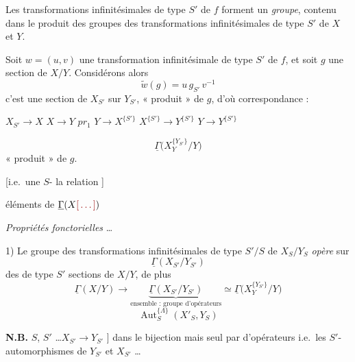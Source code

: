 \documentclass[11pt,a4paper]{article}
\begin{document}

Les transformations infinitésimales de type $S'$ de $f$ forment un
\emph{groupe}, contenu dans le produit des groupes des transformations
infinitésimales de type $S'$ de $X$ et $Y$.

Soit $w = (u, v)$ une transformation infinitésimale de type $S'$ de $f$, et
soit $g$ une section de $X/Y$. Considérons alors
\[
  \widetilde{w}(g) = u\, g_{S'}\, v^{-1}
\]
c'est une section de $X_{S'}$ sur $Y_{S'}$, « produit » de $g$, d'où
correspondance : \ill{}

\struck{\ill{}} $X_{S'} \to X$ \ill{} $X \to Y$  $pr_{1}$
\ill{} $Y \to X^{\{S'\}}$ \ill{} $X^{\{S'\}} \to Y^{\{S'\}}$ \ill{}
$Y \to Y^{\{S'\}}$ \ill{}

\[
  \underline{\Gamma}\bigl(X_{Y}^{\{Y_{S'}\}} / Y\bigr)
\]
« produit » de $g$.


[i.e.\ une \ill{} $S$-\ill{} \ill{} \ill{} la relation \ill{}]

éléments de $\underline{\Gamma}(X \ill{})$

\emph{Propriétés fonctorielles} \ldots

1) Le groupe des transformations infinitésimales de type $S'/S$ de
$X_{S}/Y_{S}$ \emph{opère} sur \ill{}
\[
  \underline{\Gamma}(X_{S'}/Y_{S'})
\]
des \ill{} de type $S'$ \ill{} sections de $X/Y$, \ill{} de plus
\[
  \underline{\Gamma}(X/Y) \longrightarrow
  \underbrace{\underline{\Gamma}(X_{S'}/Y_{S'})}_{\text{ensemble :
  groupe d'opérateurs}} \simeq
  \underline{\Gamma}\bigl(X_{Y}^{\{Y_{S'}\}} / Y\bigr)
\]
\[
  \operatorname{Aut}^{\{\Lambda\}}_{S}(X'_{S}, Y_{S})
\]

\textbf{N.B.} $S$, $S'$ \ill{} \ldots $X_{S'} \to Y_{S'}$ ] dans le \ill{}
bijection \ill{} mais seul \ill{} par \ill{} d'opérateurs \ill{} i.e.\ les
$S'$-automorphismes de $Y_{S'}$ et $X_{S'}$ \ldots
{}
\end{document}
